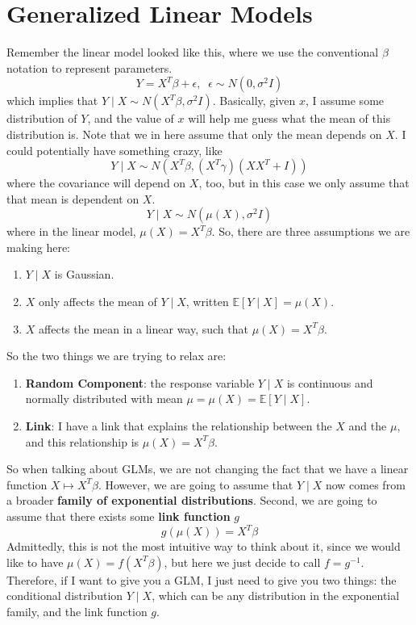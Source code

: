 \section{Generalized Linear Models} 

  Remember the linear model looked like this, where we use the conventional $\beta$ notation to represent parameters. 
  \begin{equation}
    Y = X^T \beta + \epsilon, \;\; \epsilon \sim N(0, \sigma^2 I)
  \end{equation}
  which implies that $Y \mid X \sim N(X^T \beta, \sigma^2 I)$. Basically, given $x$, I assume some distribution of $Y$, and the value of $x$ will help me guess what the mean of this distribution is. Note that we in here assume that only the mean depends on $X$. I could potentially have something crazy, like 
  \begin{equation}
    Y \mid X \sim N(X^T \beta, (X^T \gamma) (X X^T + I))
  \end{equation}
  where the covariance will depend on $X$, too, but in this case we only assume that that mean is dependent on $X$. 
  \begin{equation}
    Y \mid X \sim N(\mu(X), \sigma^2 I)
  \end{equation}
  where in the linear model, $\mu(X) = X^T \beta$. So, there are three assumptions we are making here: 
  \begin{enumerate}
    \item $Y \mid X$ is Gaussian. 
    \item $X$ only affects the mean of $Y \mid X$, written $\mathbb{E}[Y \mid X] = \mu(X)$. 
    \item $X$ affects the mean in a linear way, such that $\mu(X) = X^T \beta$. 
  \end{enumerate}
  So the two things we are trying to relax are: 
  \begin{enumerate}
    \item \textbf{Random Component}: the response variable $Y \mid X$ is continuous and normally distributed with mean $\mu = \mu(X) = \mathbb{E}[Y \mid X]$. 
    \item \textbf{Link}: I have a link that explains the relationship between the $X$ and the $\mu$, and this relationship is $\mu(X) = X^T \beta$. 
  \end{enumerate}
  So when talking about GLMs, we are not changing the fact that we have a linear function $X \mapsto X^T \beta$. However, we are going to assume that $Y \mid X$ now comes from a broader \textbf{family of exponential distributions}. Second, we are going to assume that there exists some \textbf{link function} $g$
  \begin{equation}
    g(\mu(X)) = X^T \beta
  \end{equation}
  Admittedly, this is not the most intuitive way to think about it, since we would like to have $\mu(X) = f(X^T \beta)$, but here we just decide to call $f = g^{-1}$. Therefore, if I want to give you a GLM, I just need to give you two things: the conditional distribution $Y \mid X$, which can be any distribution in the exponential family, and the link function $g$. 

